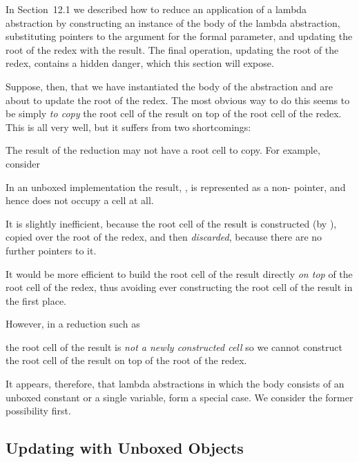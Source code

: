 In Section~12.1 we described how to reduce an application of a lambda
abstraction by constructing an instance of the body of the lambda abstraction,
substituting pointers to the argument for the formal parameter, and updating
the root of the redex with the result. The final operation, updating the root of
the redex, contains a hidden danger, which this section will expose.

Suppose, then, that we have instantiated the body of the abstraction and
are about to update the root of the redex. The most obvious way to do this
seems to be simply \textit{to copy} the root cell of the result on top of the root cell of
the redex. This is all very well, but it suffers from two shortcomings:

\begin{numbered}
    \item The result of the reduction may not have a root cell to copy. For example,
    consider
    \begin{mlcoded}
    \end{mlcoded}
    In an unboxed implementation the result, , is represented as a non-
    pointer, and hence does not occupy a cell at all.

    \item It is slightly inefficient, because the root cell of the result is constructed
    (by ), copied over the root of the redex, and then \textit{discarded},
    because there are no further pointers to it.

    \phantom{xx}It would be more efficient to build the root cell of the result directly \textit{on
        top} of the root cell of the redex, thus avoiding ever constructing the root
    cell of the result in the first place.

    \phantom{xx}However, in a reduction such as
    \begin{mlcoded}
    \end{mlcoded}
    the root cell of the result is \textit{not a newly constructed cell} so we cannot
    construct the root cell of the result on top of the root of the redex.
\end{numbered}

\noindent It appears, therefore, that lambda abstractions in which the body consists of
an unboxed constant or a single variable, form a special case. We consider the
former possibility first.

\subsection{Updating with Unboxed Objects}

